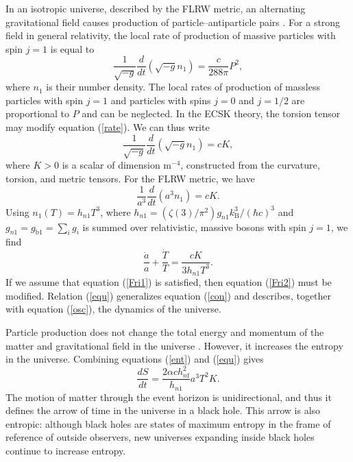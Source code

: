 \documentclass[prd,onecolumn,nofootinbib]{revtex4}
\begin{document}
In an isotropic universe, described by the FLRW metric, an alternating gravitational field causes production of particle--antiparticle pairs \cite{prod}.
For a strong field in general relativity, the local rate of production of massive particles with spin $j=1$ is equal to
\begin{equation}
\frac{1}{\sqrt{-g}}\frac{d}{dt}(\sqrt{-g}n_1)=\frac{c}{288\pi}P^2,
\label{rate}
\end{equation}
where $n_1$ is their number density.
The local rates of production of massless particles with spin $j=1$ and particles with spins $j=0$ and $j=1/2$ are proportional to $P$ and can be neglected.
In the ECSK theory, the torsion tensor may modify equation (\ref{rate}).
We can thus write
\begin{equation}
\frac{1}{\sqrt{-g}}\frac{d}{dt}(\sqrt{-g}n_1)=cK,
\end{equation}
where $K>0$ is a scalar of dimension m$^{-4}$, constructed from the curvature, torsion, and metric tensors.
For the FLRW metric, we have
\begin{equation}
\frac{1}{a^3}\frac{d}{dt}(a^3 n_1)=cK.
\end{equation}
Using $n_1(T)=h_{n1}T^3$, where $h_{n1}=(\zeta(3)/\pi^2)g_{n1}k_\textrm{B}^3/(\hbar c)^3$ and $g_{n1}=g_{\textrm{b}1}=\sum_i g_i$ is summed over relativistic, massive bosons with spin $j=1$, we find
\begin{equation}
\frac{\dot{a}}{a}+\frac{\dot{T}}{T}=\frac{cK}{3h_{n1}T^3}.
\label{equ}
\end{equation}
If we assume that equation (\ref{Fri1}) is satisfied, then equation (\ref{Fri2}) must be modified. 
Relation (\ref{equ}) generalizes equation (\ref{con}) and describes, together with equation (\ref{osc}), the dynamics of the universe.

Particle production does not change the total energy and momentum of the matter and gravitational field in the universe \cite{torsion4}.
However, it increases the entropy in the universe.
Combining equations (\ref{ent}) and (\ref{equ}) gives
\begin{equation}
\frac{dS}{dt}=\frac{2\alpha ch_{n\textrm{f}}^2}{h_{n1}}a^3 T^2 K.
\end{equation}
The motion of matter through the event horizon is unidirectional, and thus it defines the arrow of time in the universe in a black hole.
This arrow is also entropic: although black holes are states of maximum entropy in the frame of reference of outside observers, new universes expanding inside black holes continue to increase entropy.
\end{document}
